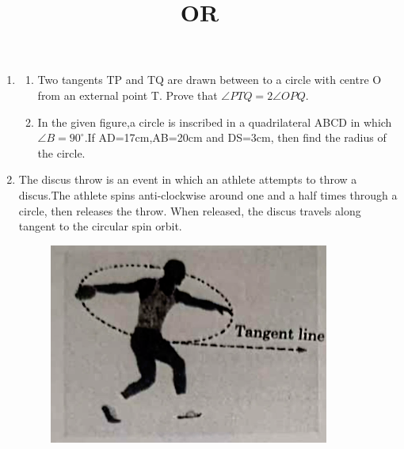 \documentclass[12pt,A4 paper]{article}
\begin{document}
\begin{enumerate}
\begin{figure}[h]
	        \centering
	        
        \end{figure}


\pagebreak
\item
  \begin{enumerate}
    \item Two tangents TP and TQ are drawn between to a circle with centre O from an external point T. Prove that $\angle PTQ = 2 \angle OPQ$.\\
\begin{figure}[h]
	        \centering
	        
		\caption{}
		\label{fig:5}
        \end{figure}



\begin{center}
    \title{OR}
\end{center}
\item In the given figure,a circle is inscribed in a quadrilateral ABCD in which $\angle B =90 ^{\circ}$.If AD=17cm,AB=20cm and DS=3cm, then find the radius of the circle.

\begin{figure}[h]
	        \centering
	        
		\caption{}
		\label{fig:6}
\end{figure}
   \end{enumerate}




\item The discus throw is an event in which an athlete attempts to throw a discus.The athlete spins anti-clockwise around one and a half times through a circle, then releases the throw. When released, the discus travels along tangent to the circular spin orbit.


\begin{figure}[ht]	

	        \centering
		\includegraphics[width=0.7\columnwidth]{image/fig0.png}
		\caption{}
		\label{fig:0}
\end{figure}
\pagebreak


\end{enumerate}
\end{document}
